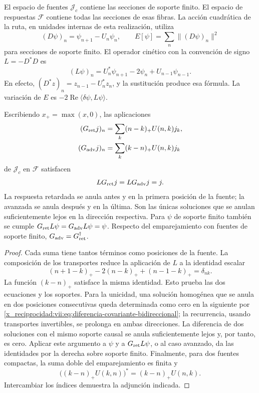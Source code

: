 El espacio de fuentes \(\mathcal J_c\) contiene las secciones de soporte
finito. El espacio de respuestas \(\mathcal F\) contiene todas las
secciones de esas fibras. La acción cuadrática de la ruta, en unidades
internas de esta realización, utiliza
\[
 (D\psi)_n=\psi_{n+1}-U_n\psi_n,\qquad
 E[\psi]=\sum_n\|(D\psi)_n\|^2
\]
para secciones de soporte finito. El operador cinético con la convención
de signo \(L=-D^*D\) es
\begin{equation}
 (L\psi)_n=U_n^*\psi_{n+1}-2\psi_n+U_{n-1}\psi_{n-1}.
 \label{x_reciprocidad:vii:eq:diferencia-covariante-bidireccional}
\end{equation}
En efecto, \((D^*z)_n=z_{n-1}-U_n^*z_n\), y la sustitución produce
esa fórmula. La variación de \(E\) es
\(-2\operatorname{Re}\langle\delta\psi,L\psi\rangle\).

\begin{theorem}
\label{x_reciprocidad:vii:thm:green-cronologico}
Escribiendo \(x_+=\max(x,0)\), las aplicaciones
\begin{align}
 (G_{\rm ret}j)_n&=\sum_k(n-k)_+U(n,k)j_k,\label{x_reciprocidad:vii:eq:green-ret-cronologico}\\
 (G_{\rm adv}j)_n&=\sum_k(k-n)_+U(n,k)j_k\label{x_reciprocidad:vii:eq:green-adv-cronologico}
\end{align}
de \(\mathcal J_c\) en \(\mathcal F\) satisfacen
\[
 LG_{\rm ret}j=LG_{\rm adv}j=j.
\]
La respuesta retardada se anula antes y en la primera posición de la
fuente; la avanzada se anula después y en la última. Son las únicas
soluciones que se anulan suficientemente lejos en la dirección respectiva.
Para \(\psi\) de soporte finito también se cumple
\(G_{\rm ret}L\psi=G_{\rm adv}L\psi=\psi\).
Respecto del emparejamiento con fuentes de soporte finito,
\(G_{\rm adv}=G_{\rm ret}^{\dagger}\).
\end{theorem}
\begin{proof}
Cada suma tiene tantos términos como posiciones de la fuente.
La composición de los transportes reduce la aplicación de \(L\) a
la identidad escalar
\[
 (n+1-k)_+-2(n-k)_++(n-1-k)_+=\delta_{nk}.
\]
La función \((k-n)_+\) satisface la misma identidad. Esto prueba
las dos ecuaciones y los soportes. Para la unicidad, una solución
homogénea que se anula en dos posiciones consecutivas queda determinada
como cero en la siguiente por \eqref{x_reciprocidad:vii:eq:diferencia-covariante-bidireccional};
la recurrencia, usando transportes invertibles, se prolonga en ambas
direcciones. La diferencia de dos soluciones con el mismo soporte causal
se anula suficientemente lejos y, por tanto, es cero.
Aplicar este argumento a \(\psi\) y a \(G_{\rm ret}L\psi\), o al
caso avanzado, da las identidades por la derecha sobre soporte finito.
Finalmente, para dos fuentes compactas, la suma doble del emparejamiento
es finita y
\[
 \bigl((k-n)_+U(k,n)\bigr)^*=(k-n)_+U(n,k).
\]
Intercambiar los índices demuestra la adjunción indicada.
\end{proof}

